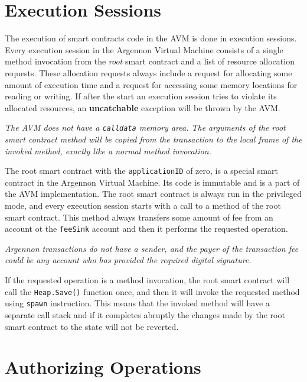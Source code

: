 \documentclass[11pt, a4paper]{report}
\newcommand{\note}[1] {
    \begin{tcolorbox}[colframe=white,colback=white]
        \emph{#1}
    \end{tcolorbox}
}
\begin{document}
    \section{Execution Sessions}\label{sec:execution-sessions}

    The execution of smart contracts code in the AVM is done in execution sessions. Every execution session in the
    Argennon Virtual Machine consists of a single method invocation from the \emph{root} smart contract and a list
    of resource allocation requests. These allocation requests always include a request for allocating some amount
    of execution time and a request for accessing some memory locations for reading or writing. If after the start
    an execution session tries to violate its allocated resources, an \textbf{uncatchable} exception will
    be thrown by the AVM\@.

    \note{The AVM does not have a \texttt{calldata} memory area. The arguments of the root smart contract method will
    be copied from the transaction to the local frame of the invoked method, exactly like a normal method invocation.}

    The root smart contract with the \texttt{applicationID} of zero, is a special smart contract in the Argennon
    Virtual Machine. Its code is immutable and is a part of the AVM implementation. The root smart contract is always
    run in the privileged mode, and every execution session starts with a call to a method of the root smart contract.
    This method always transfers some amount of fee from an account ot the \texttt{feeSink} account and then it
    performs the requested operation.

    \note{Argennon transactions do not have a sender, and the payer of the transaction fee could be any
    account who has provided the required digital signature.}

    If the requested operation is a method invocation, the root smart contract will call the \texttt{Heap.Save()}
    function once, and then it will invoke the requested method using \texttt{spawn} instruction. This means that the
    invoked method will have a separate call stack and if it completes abruptly the changes made by the root
    smart contract to the state will not be reverted.


    \section{Authorizing Operations}\label{sec:authorizing-operations}
\end{document}

